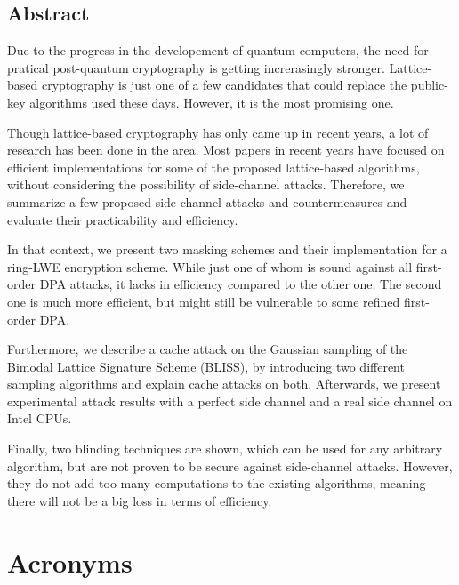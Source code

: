 \documentclass[a4paper,12pt,twoside,openany,headsepline,bibliography=totocnumbered]{scrbook}
\begin{document}


\section*{Abstract}
Due to the progress in the developement of quantum computers, the need for pratical post-quantum cryptography is getting increrasingly stronger. Lattice-based cryptography is just one of a few candidates that could replace the public-key algorithms used these days. However, it is the most promising one.

Though lattice-based cryptography has only came up in recent years, a lot of research has been done in the area. Most papers in recent years have focused on efficient implementations for some of the proposed lattice-based algorithms, without considering the possibility of side-channel attacks. Therefore, we summarize a few proposed side-channel attacks and  countermeasures and evaluate their practicability and efficiency.

In that context, we present two masking schemes and their implementation for a ring-LWE encryption scheme. While just one of whom is sound against all first-order DPA attacks, it lacks in efficiency compared to the other one. The second one is much more efficient, but might still be vulnerable to some refined first-order DPA.

Furthermore, we describe a cache attack on the Gaussian sampling of the Bimodal Lattice Signature Scheme (BLISS), by introducing two different sampling algorithms and explain cache attacks on both. Afterwards, we present experimental attack results with a perfect side channel and a real side channel on Intel CPUs.

Finally, two blinding techniques are shown, which can be used for any arbitrary algorithm, but are not proven to be secure against side-channel attacks. However, they do not add too many computations to the existing algorithms, meaning there will not be a big loss in terms of efficiency.
\clearpage

\tableofcontents
\mainmatter

\chapter*{Acronyms}
\begin{acronym}
 	\setlength{\itemsep}{0.2em} 
\end{acronym}
\end{document}
